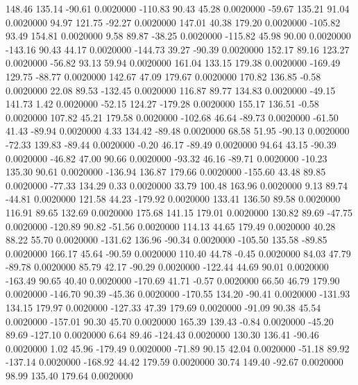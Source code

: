   148.46  135.14  -90.61   0.0020000
 -110.83   90.43   45.28   0.0020000
  -59.67  135.21   91.04   0.0020000
   94.97  121.75  -92.27   0.0020000
  147.01   40.38  179.20   0.0020000
 -105.82   93.49  154.81   0.0020000
    9.58   89.87  -38.25   0.0020000
 -115.82   45.98   90.00   0.0020000
 -143.16   90.43   44.17   0.0020000
 -144.73   39.27  -90.39   0.0020000
  152.17   89.16  123.27   0.0020000
  -56.82   93.13   59.94   0.0020000
  161.04  133.15  179.38   0.0020000
 -169.49  129.75  -88.77   0.0020000
  142.67   47.09  179.67   0.0020000
  170.82  136.85   -0.58   0.0020000
   22.08   89.53 -132.45   0.0020000
  116.87   89.77  134.83   0.0020000
  -49.15  141.73    1.42   0.0020000
  -52.15  124.27 -179.28   0.0020000
  155.17  136.51   -0.58   0.0020000
  107.82   45.21  179.58   0.0020000
 -102.68   46.64  -89.73   0.0020000
  -61.50   41.43  -89.94   0.0020000
    4.33  134.42  -89.48   0.0020000
   68.58   51.95  -90.13   0.0020000
  -72.33  139.83  -89.44   0.0020000
   -0.20   46.17  -89.49   0.0020000
   94.64   43.15  -90.39   0.0020000
  -46.82   47.00   90.66   0.0020000
  -93.32   46.16  -89.71   0.0020000
  -10.23  135.30   90.61   0.0020000
 -136.94  136.87  179.66   0.0020000
 -155.60   43.48   89.85   0.0020000
  -77.33  134.29    0.33   0.0020000
   33.79  100.48  163.96   0.0020000
    9.13   89.74  -44.81   0.0020000
  121.58   44.23 -179.92   0.0020000
  133.41  136.50   89.58   0.0020000
  116.91   89.65  132.69   0.0020000
  175.68  141.15  179.01   0.0020000
  130.82   89.69  -47.75   0.0020000
 -120.89   90.82  -51.56   0.0020000
  114.13   44.65  179.49   0.0020000
   40.28   88.22   55.70   0.0020000
 -131.62  136.96  -90.34   0.0020000
 -105.50  135.58  -89.85   0.0020000
  166.17   45.64  -90.59   0.0020000
  110.40   44.78   -0.45   0.0020000
   84.03   47.79  -89.78   0.0020000
   85.79   42.17  -90.29   0.0020000
 -122.44   44.69   90.01   0.0020000
 -163.49   90.65   40.40   0.0020000
 -170.69   41.71   -0.57   0.0020000
   66.50   46.79  179.90   0.0020000
 -146.70   90.39  -45.36   0.0020000
 -170.55  134.20  -90.41   0.0020000
 -131.93  134.15  179.97   0.0020000
 -127.33   47.39  179.69   0.0020000
  -91.09   90.38   45.54   0.0020000
 -157.01   90.30   45.70   0.0020000
  165.39  139.43   -0.84   0.0020000
  -45.20   89.69 -127.10   0.0020000
    6.64   89.46 -124.43   0.0020000
  130.30  136.41  -90.46   0.0020000
    1.02   45.96 -179.49   0.0020000
  -71.89   90.15   42.04   0.0020000
  -51.18   89.92 -137.14   0.0020000
 -168.92   44.42  179.59   0.0020000
   30.74  149.40  -92.67   0.0020000
   98.99  135.40  179.64   0.0020000
